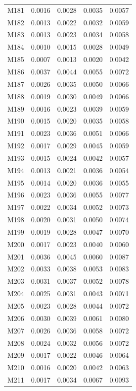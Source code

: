 \begin{longtable}{lrrrr}
M181 & 0.0016 & 0.0028 & 0.0035 & 0.0057 \\
M182 & 0.0013 & 0.0022 & 0.0032 & 0.0059 \\
M183 & 0.0013 & 0.0023 & 0.0034 & 0.0058 \\
M184 & 0.0010 & 0.0015 & 0.0028 & 0.0049 \\
M185 & 0.0007 & 0.0013 & 0.0020 & 0.0042 \\
M186 & 0.0037 & 0.0044 & 0.0055 & 0.0072 \\
M187 & 0.0026 & 0.0035 & 0.0050 & 0.0066 \\
M188 & 0.0019 & 0.0030 & 0.0049 & 0.0066 \\
M189 & 0.0016 & 0.0023 & 0.0039 & 0.0059 \\
M190 & 0.0015 & 0.0020 & 0.0035 & 0.0058 \\
M191 & 0.0023 & 0.0036 & 0.0051 & 0.0066 \\
M192 & 0.0017 & 0.0029 & 0.0045 & 0.0059 \\
M193 & 0.0015 & 0.0024 & 0.0042 & 0.0057 \\
M194 & 0.0013 & 0.0021 & 0.0036 & 0.0054 \\
M195 & 0.0014 & 0.0020 & 0.0036 & 0.0055 \\
M196 & 0.0023 & 0.0036 & 0.0055 & 0.0077 \\
M197 & 0.0022 & 0.0034 & 0.0052 & 0.0073 \\
M198 & 0.0020 & 0.0031 & 0.0050 & 0.0074 \\
M199 & 0.0019 & 0.0028 & 0.0047 & 0.0070 \\
M200 & 0.0017 & 0.0023 & 0.0040 & 0.0060 \\
M201 & 0.0036 & 0.0045 & 0.0060 & 0.0087 \\
M202 & 0.0033 & 0.0038 & 0.0053 & 0.0083 \\
M203 & 0.0031 & 0.0037 & 0.0052 & 0.0078 \\
M204 & 0.0025 & 0.0031 & 0.0043 & 0.0071 \\
M205 & 0.0023 & 0.0028 & 0.0044 & 0.0072 \\
M206 & 0.0030 & 0.0039 & 0.0061 & 0.0080 \\
M207 & 0.0026 & 0.0036 & 0.0058 & 0.0072 \\
M208 & 0.0024 & 0.0032 & 0.0056 & 0.0072 \\
M209 & 0.0017 & 0.0022 & 0.0046 & 0.0064 \\
M210 & 0.0016 & 0.0020 & 0.0042 & 0.0063 \\
M211 & 0.0017 & 0.0034 & 0.0067 & 0.0093 \\

\end{longtable}
